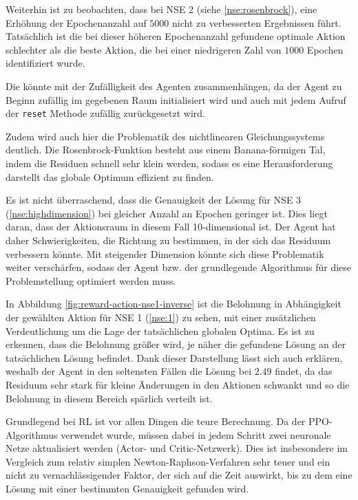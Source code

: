 \documentclass{article}
\def\code#1{\texttt{#1}}
\theoremstyle{newline}
\begin{document}
\begin{onehalfspace}
Weiterhin ist zu beobachten, dass bei NSE 2 (siehe \ref{nse:rosenbrock}), eine Erhöhung der Epochenanzahl auf $5000$ nicht zu verbesserten Ergebnissen führt. Tatsächlich ist die bei dieser höheren Epochenanzahl gefundene optimale Aktion schlechter als die beste Aktion, die bei einer niedrigeren Zahl von $1000$ Epochen identifiziert wurde.

Die könnte mit der Zufälligkeit des Agenten zusammenhängen, da der Agent zu Beginn zufällig im gegebenen Raum initialisiert wird und auch mit jedem Aufruf der \code{reset} Methode zufällig zurückgesetzt wird.

Zudem wird auch hier die Problematik des nichtlinearen Gleichungssystems deutlich. Die Rosenbrock-Funktion besteht aus einem \glqq Banana\grqq{}-förmigen Tal, indem die Residuen schnell sehr klein werden, sodass es eine Herausforderung darstellt das globale Optimum effizient zu finden. 
\medskip

Es ist nicht überraschend, dass die Genauigkeit der Lösung für NSE 3 (\ref{nse:highdimension}) bei gleicher Anzahl an Epochen geringer ist. Dies liegt daran, dass der Aktionsraum in diesem Fall 10-dimensional ist. Der Agent hat daher Schwierigkeiten, die Richtung zu bestimmen, in der sich das Residuum verbessern könnte. Mit steigender Dimension könnte sich diese Problematik weiter verschärfen, sodass der Agent bzw. der grundlegende Algorithmus für diese Problemstellung optimiert werden muss.
\medskip

In Abbildung \ref{fig:reward-action-nse1-inverse} ist die Belohnung in Abhängigkeit der gewählten Aktion für NSE 1 (\ref{nse:1}) zu sehen, mit einer zusätzlichen Verdeutlichung um die Lage der tatsächlichen globalen Optima. Es ist zu erkennen, dass die Belohnung größer wird, je näher die gefundene Lösung an der tatsächlichen Lösung befindet. Dank dieser Darstellung lässt sich auch erklären, weshalb der Agent in den seltensten Fällen die Lösung bei $2.49$ findet, da das Residuum sehr stark für kleine Änderungen in den Aktionen schwankt und so die Belohnung in diesem Bereich spärlich verteilt ist. 
\medskip

Grundlegend bei RL ist vor allen Dingen die \glqq teure\grqq{} Berechnung. Da der PPO-Algorithmus verwendet wurde, müssen dabei in jedem Schritt zwei neuronale Netze aktualisiert werden (Actor- und Critic-Netzwerk). Dies ist insbesondere im Vergleich zum relativ simplen Newton-Raphson-Verfahren sehr teuer und ein nicht zu vernachlässigender Faktor, der sich auf die Zeit auswirkt, bis zu dem eine Lösung mit einer bestimmten Genauigkeit gefunden wird.
\\


\end{onehalfspace}
\end{document}
